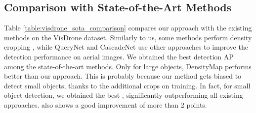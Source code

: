 \begin{table}
    \centering
    \caption{Results with anchor free detector FCOS on the Visdrone dataset. All results are without using P2.}
    \label{table:fcos_result}
\end{table}

\subsection{Comparison with State-of-the-Art Methods}
Table \ref{table:visdrone_sota_comparison} compares our approach with the existing methods on the VisDrone dataset. Similarly to us, some methods perform density cropping \cite{clusnet-Yang-2019,dmap-Li-2020,dmap-Duan-2021,glsan-Deng-2020}, while QueryNet\cite{querydet-Yang-2022} and CascadeNet \cite{cascadenet-Zhang-2019} use other approaches to improve the detection performance on aerial images. We obtained the best detection AP among the state-of-the-art methods. Only for large objects, DensityMap performs better than our approach. This is probably because our method gets biased to detect small objects, thanks to the additional crops on training. In fact, for small object detection, we obtained the best , significantly outperforming all existing approaches.  also shows a good improvement of more than 2 points.

